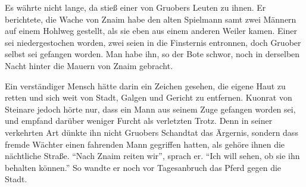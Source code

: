 Es währte nicht lange, da stieß einer von \gls{Gruober}s Leuten zu ihnen. Er berichtete, die Wache von \gls{Znaim} habe den alten Spielmann samt zwei Männern auf einem Hohlweg gestellt, als sie eben aus einem anderen Weiler kamen. Einer sei niedergestochen worden, zwei seien in die Finsternis entronnen, doch \gls{Gruober} selbst sei gefangen worden. Man habe ihn, so der Bote schwor, noch in derselben Nacht hinter die Mauern von \gls{Znaim} gebracht.

Ein verständiger Mensch hätte darin ein Zeichen gesehen, die eigene Haut zu retten und sich weit von Stadt, Galgen und Gericht zu entfernen. \gls{Kuonrat von Steinare} jedoch hörte nur, dass ein Mann aus seinem Zuge gefangen worden sei, und empfand darüber weniger Furcht als verletzten Trotz. Denn in seiner verkehrten Art dünkte ihn nicht \gls{Gruober}s Schandtat das Ärgernis, sondern dass fremde Wächter einen fahrenden Mann gegriffen hatten, als gehöre ihnen die nächtliche Straße. \enquote{Nach \gls{Znaim} reiten wir}, sprach er. \enquote{Ich will sehen, ob sie ihn behalten können.} So wandte er noch vor Tagesanbruch das Pferd gegen die Stadt.

